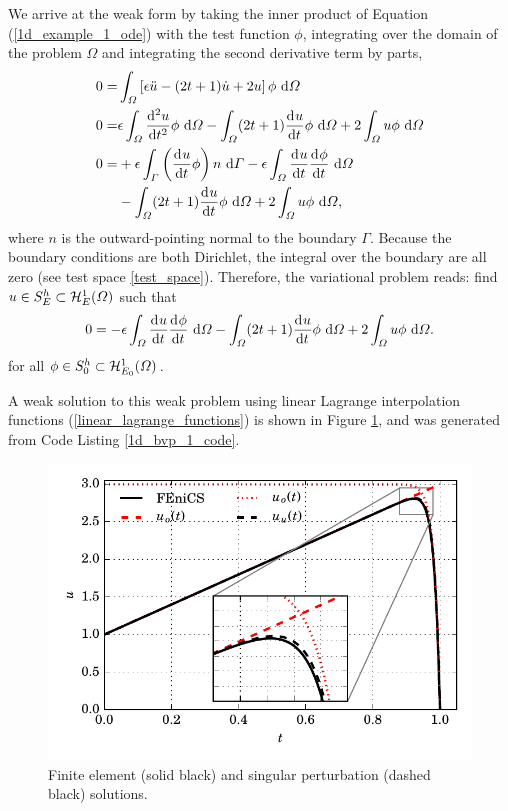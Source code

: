   We arrive at the weak form by taking the inner product of Equation (\ref{1d_example_1_ode}) with the test function $\phi$, integrating over the domain of the problem $\Omega$ and integrating the second derivative term by parts,
  \begin{align*}
    0 = &\int_{\Omega} \left[ \epsilon \ddot{u} - (2t + 1)\dot{u} + 2u \right] \phi \d{\Omega} \\
    0 = &\epsilon \int_{\Omega} \totder[2]{u}{t} \phi \d{\Omega} - \int_{\Omega} (2t + 1) \totder{u}{t} \phi \d{\Omega} + 2\int_{\Omega} u \phi \d{\Omega} \\
    0 = &+\epsilon \int_{\Gamma} \left( \totder{u}{t} \phi \right) n \d{\Gamma} - \epsilon \int_{\Omega} \totder{u}{t} \totder{\phi}{t} \d{\Omega} \\
    &- \int_{\Omega} (2t + 1) \totder{u}{t} \phi \d{\Omega} + 2\int_{\Omega} u \phi \d{\Omega},
  \end{align*}
  where $n$ is the outward-pointing normal to the boundary $\Gamma$.  Because the boundary conditions are both Dirichlet, the integral over the boundary are all zero (see test space \ref{test_space}).  Therefore, the variational problem reads: find $u \in \trialspace$ such that 
  \begin{align*}
    0 = - \epsilon \int_{\Omega} \totder{u}{t} \totder{\phi}{t} \d{\Omega} - \int_{\Omega} (2t + 1) \totder{u}{t} \phi \d{\Omega} + 2\int_{\Omega} u \phi \d{\Omega}.
  \end{align*}
  for all $\phi \in \testspace$.
    
  A weak solution to this weak problem using linear Lagrange interpolation functions (\ref{linear_lagrange_functions}) is shown in Figure \ref{1d_bvp_1_image}, and was generated from Code Listing \ref{1d_bvp_1_code}.

  
  \begin{figure}
    \centering
      \includegraphics[width=\linewidth]{images/fenics_intro/1D_BVP_1.pdf}
    \caption[Singular-perturbation solution]{Finite element (solid black) and singular perturbation (dashed black) solutions.}
    \label{1d_bvp_1_image}
  \end{figure}

